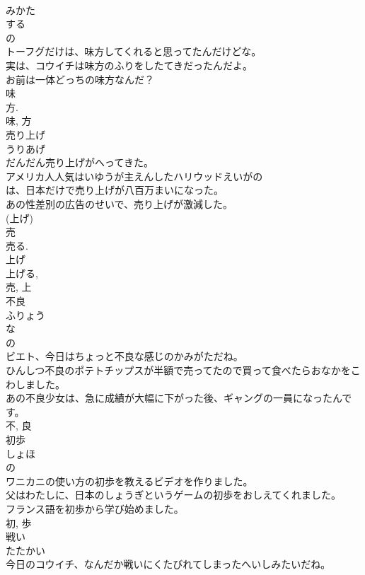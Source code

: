 \documentclass[8pt]{extreport}
\begin{document}
\begin{CJK}{UTF8}{min}
\\	みかた	
\\	する 
\\	の 
\\	トーフグだけは、味方してくれると思ってたんだけどな。	
\\	実は、コウイチは味方のふりをしたてきだったんだよ。	
\\	お前は一体どっちの味方なんだ？	
\\	味 
\\	方. 
\\	味, 方	
\\	売り上げ	
\\	うりあげ	
\\	だんだん売り上げがへってきた。	
\\	アメリカ人人気はいゆうが主えんしたハリウッドえいがの
\\	は、日本だけで売り上げが八百万まいになった。	
\\	あの性差別の広告のせいで、売り上げが激減した。	
\\	(上げ) 
\\	売 
\\	売る. 
\\	上げ 
\\	上げる, 
\\	売, 上	
\\	不良	
\\	ふりょう	
\\	な 
\\	の 
\\	ビエト、今日はちょっと不良な感じのかみがただね。	
\\	ひんしつ不良のポテトチップスが半額で売ってたので買って食べたらおなかをこわしました。	
\\	あの不良少女は、急に成績が大幅に下がった後、ギャングの一員になったんです。	
\\	不, 良	
\\	初歩	
\\	しょほ	
\\	の 
\\	ワニカニの使い方の初歩を教えるビデオを作りました。	
\\	父はわたしに、日本のしょうぎというゲームの初歩をおしえてくれました。	
\\	フランス語を初歩から学び始めました。	
\\	初, 歩	
\\	戦い	
\\	たたかい	
\\	今日のコウイチ、なんだか戦いにくたびれてしまったへいしみたいだね。	

\end{CJK}
\end{document}

